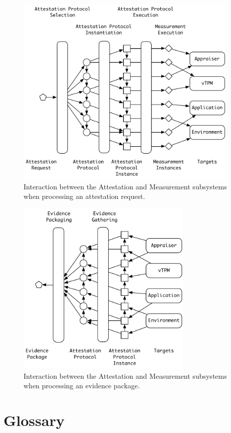 \documentclass[10pt]{article}
\begin{document}
\begin{figure}
\centering 
\includegraphics[width=0.950\textwidth]{figures/ap-1.pdf}
\caption{Interaction between the Attestation and Measurement
  subsystems when processing an attestation request.}
\label{fig:ap-1}
\end{figure}

\begin{figure}
\centering 
\includegraphics[width=0.750\textwidth]{figures/ap-2.pdf}
\caption{Interaction between the Attestation and Measurement
  subsystems when processing an evidence package.}
\label{fig:ap-2}
\end{figure}

\appendix

\section{Glossary}



\end{document}
